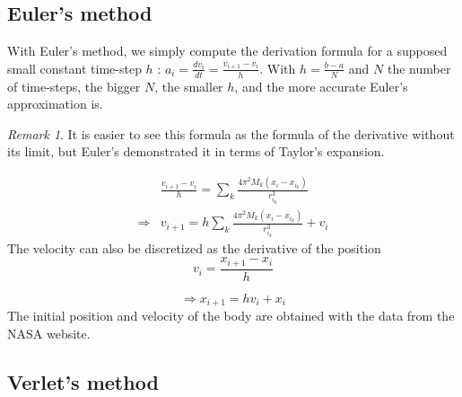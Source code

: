 \documentclass[a4paper, twoside, 11pt]{report}
\theoremstyle{theorem}
\theoremstyle{remark}
\newtheorem{remark}{Remark}[chapter]
\theoremstyle{exemple}
\begin{document}
        \subsection{Euler's method}
            
             With Euler's method, we simply compute the derivation formula for a supposed small constant time-step $h$ : $\displaystyle a_i = \frac{d{v}_{i}}{dt}=\frac{v_{i+1} - v_i}{h}$. With $\displaystyle h = \frac{b-a}{N}$ and $N$ the number of time-steps, the bigger $N$, the smaller $h$, and the more accurate Euler's approximation is.
             
             \begin{remark}
             	It is easier to see this formula as the formula of the derivative without its limit, but Euler's demonstrated it in terms of Taylor's expansion.
			\end{remark}
			 
                \begin{align*}
                     &\frac{v_{i+1} - v_i}{h} = \sum\limits_{k}\frac{4\pi^2M_k(x_i-x_{i_k})}{r_{i_k}^3} \\
                     \Longrightarrow &v_{i+1} = h\sum\limits_{k}\frac{4\pi^2M_k(x_i-x_{i_k})}{r_{i_k}^3} + v_i
                    \tag{11}
                \end{align*}
             The velocity can also be discretized as the derivative of the position
                \begin{equation*}
                      v_i = \frac{x_{i+1}-x_i}{h}
                  \end{equation*}
             
                 \begin{equation*}
                    \Longrightarrow x_{i+1} = hv_i + x_i
                    \tag{12}
                \end{equation*}   
            The initial position and velocity of the body are obtained with the data from the NASA website.
            
        \subsection{Verlet's method}
\end{document}
